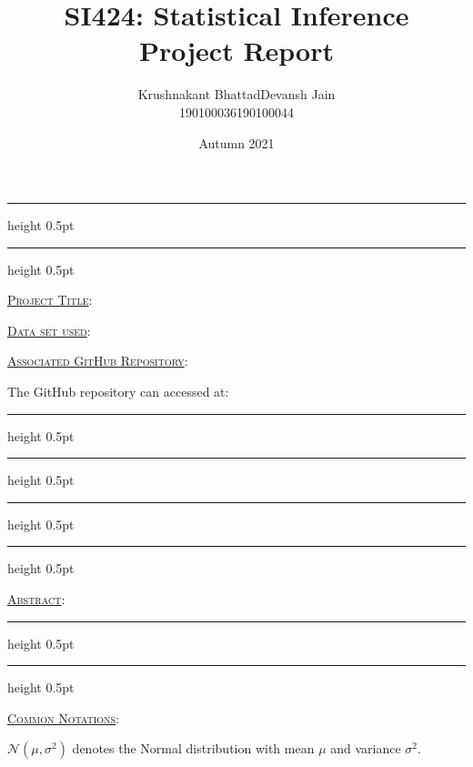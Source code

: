 \documentclass[fleqn, 11pt]{article}
\title{SI424: Statistical Inference \\ Project Report}
\author{
    \begin{tabular}{|c|c|}
        \hline
        \textsf{Krushnakant Bhattad} & \textsf{ \hspace{5pt} Devansh Jain \hspace{5pt} } \\
        \hline
        \textsf{190100036} & \textsf{190100044}\\
        \hline
    \end{tabular}
}
\date{Autumn 2021}
\newcommand{\myline}{
    \par
    \kern3pt %
    \hrule height 0.5pt
    \kern2pt %
    \hrule height 0.5pt
    \kern3pt %
    \par
}
\renewcommand{\arraystretch}{2}%
\begin{document}
\maketitle
\thispagestyle{empty}
\renewcommand{\arraystretch}{1}%

\myline

\vspace{7pt}

\underline{\large {\textsc{Project Title}}}:

\medskip


\hrulefill

\vspace{10pt}

\underline{\large {\textsc{Data set used}}}:

\medskip


\hrulefill

\vspace{10pt}

\underline{\large {\textsc{Associated GitHub Repository}}}:

\medskip

The GitHub repository can accessed at:

\vspace{7pt}

\myline

\newpage

\setcounter{page}{1}

\vspace{-2em}
\myline

\vspace{10pt}

\underline{\large {\textsc{Abstract}}}:

\medskip


\vspace{7pt}

\myline

\vspace{10pt}

\underline{\large {\textsc{Common Notations}}}:

\medskip


$\mathcal{N}(\mu, \sigma^2)$ denotes the Normal distribution with mean $\mu$ and variance $\sigma^2$.

\begin{comment}
It has the probability distribution: $p(x) = \dfrac{1}{\sqrt{2 \pi \sigma^2}} \exp \left(\dfrac{-(x-\mu)^2}{2 \sigma^2}\right)$
\end{comment}
\end{document}
